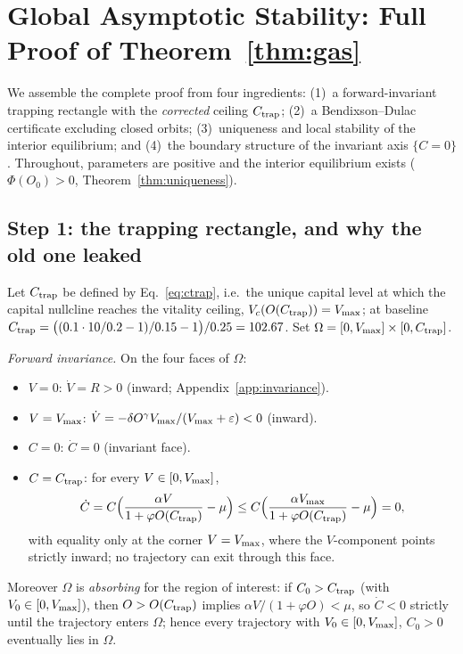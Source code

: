 \section{Global Asymptotic Stability: Full Proof of Theorem~\ref{thm:gas}}
\label{app:gas}

We assemble the complete proof from four ingredients: (1)~a forward-invariant
trapping rectangle with the \emph{corrected} ceiling $C_{\mathrm{trap}}$;
(2)~a Bendixson--Dulac certificate excluding closed orbits;
(3)~uniqueness and local stability of the interior equilibrium; and
(4)~the boundary structure of the invariant axis $\{C=0\}$. Throughout,
parameters are positive and the interior equilibrium exists
($\Phi(O_0)>0$, Theorem~\ref{thm:uniqueness}).

\subsection{Step 1: the trapping rectangle, and why the old one leaked}

Let $C_{\mathrm{trap}}$ be defined by Eq.~\eqref{eq:ctrap}, i.e.\ the unique capital
level at which the capital nullcline reaches the vitality ceiling,
$V_c(O(C_{\mathrm{trap}}))=V_{\max}$; at baseline
$C_{\mathrm{trap}}=\bigl((0.1\cdot10/0.2-1)/0.15-1\bigr)/0.25=102.67$. Set
$\Omega=[0,V_{\max}]\times[0,C_{\mathrm{trap}}]$.

\emph{Forward invariance.} On the four faces of $\Omega$:
\begin{itemize}
\item $V=0$: $\dot V=R>0$ (inward; Appendix~\ref{app:invariance}).
\item $V=V_{\max}$: $\dot V=-\delta O^{\gamma}V_{\max}/(V_{\max}+\varepsilon)<0$
(inward).
\item $C=0$: $\dot C=0$ (invariant face).
\item $C=C_{\mathrm{trap}}$: for every $V\in[0,V_{\max}]$,
\[
\dot C
= C\Bigl(\frac{\alpha V}{1+\varphi O(C_{\mathrm{trap}})}-\mu\Bigr)
\le C\Bigl(\frac{\alpha V_{\max}}{1+\varphi O(C_{\mathrm{trap}})}-\mu\Bigr)
= 0,
\]
with equality only at the corner $V=V_{\max}$, where the $V$-component points
strictly inward; no trajectory can exit through this face.
\end{itemize}
Moreover $\Omega$ is \emph{absorbing} for the region of interest: if
$C_0>C_{\mathrm{trap}}$ (with $V_0\in[0,V_{\max}]$), then $O>O(C_{\mathrm{trap}})$ implies
$\alpha V/(1+\varphi O)<\mu$, so $\dot C<0$ strictly until the trajectory
enters $\Omega$; hence every trajectory with $V_0\in[0,V_{\max}]$, $C_0>0$
eventually lies in $\Omega$.

